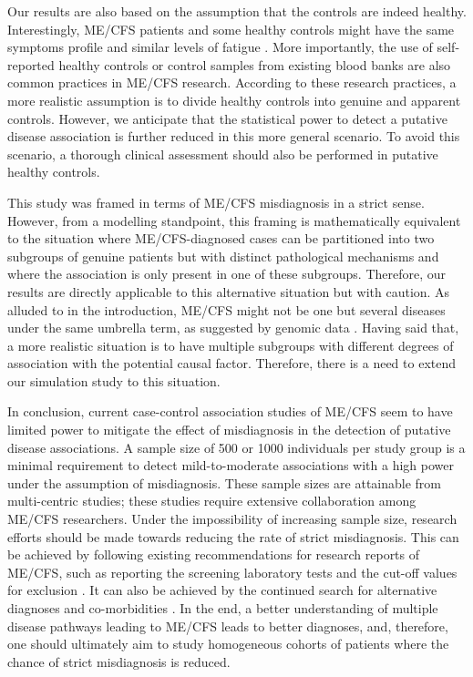 Our results are also based on the assumption that the controls are indeed healthy. Interestingly, ME/CFS patients and some healthy controls might have the same symptoms profile and similar levels of fatigue \citep{cella2010MeasuringFatigue, malato2021Statisticalchallenges}. More importantly, the use of self-reported healthy controls \citep{loebel2017SerologicalProfiling, szklarski2021DelineatingAssociationa} or control samples from existing blood banks \citep{kaushik2005GeneExpression, johnston2016TargetedGenome, lande2020HumanLeukocyte} are also common practices in ME/CFS research. According to these research practices, a more realistic assumption is to divide healthy controls into genuine and apparent controls. However, we anticipate that the statistical power to detect a putative disease association is further reduced in this more general scenario. To avoid this scenario, a thorough clinical assessment should also be performed in putative healthy controls.

This study was framed in terms of ME/CFS misdiagnosis in a strict sense. However, from a modelling standpoint, this framing is mathematically equivalent to the situation where ME/CFS-diagnosed cases can be partitioned into two subgroups of genuine patients but with distinct pathological mechanisms and where the association is only present in one of these subgroups. Therefore, our results are directly applicable to this alternative situation but with caution. As alluded to in the introduction, ME/CFS might not be one but several diseases under the same umbrella term, as suggested by genomic data \citep{kerr2008GeneExpression, zhang2010MicrobialInfections}. Having said that, a more realistic situation is to have multiple subgroups with different degrees of association with the potential causal factor. Therefore, there is a need to extend our simulation study to this situation.

In conclusion, current case-control association studies of ME/CFS seem to have limited power to mitigate the effect of misdiagnosis in the detection of putative disease associations. A sample size of 500 or 1000 individuals per study group is a minimal requirement to detect mild-to-moderate associations with a high power under the assumption of misdiagnosis. These sample sizes are attainable from multi-centric studies; these studies require extensive collaboration among ME/CFS researchers. Under the impossibility of increasing sample size, research efforts should be made towards reducing the rate of strict misdiagnosis. This can be achieved by following existing recommendations for research reports of ME/CFS, such as reporting the screening laboratory tests and the cut-off values for exclusion \citep{jason2012MinimumData}. It can also be achieved by the continued search for alternative diagnoses and co-morbidities \citep{nacul2021EuropeanNetwork}. In the end, a better understanding of multiple disease pathways leading to ME/CFS leads to better diagnoses, and, therefore, one should ultimately aim to study homogeneous cohorts of patients where the chance of strict misdiagnosis is reduced.

